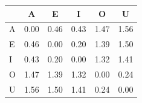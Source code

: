 \begin{tabular}{lccccc}
\toprule
\rowcolor{col01}
 & A & E & I & O & U \\
\midrule
A & 0.00 & 0.46 & 0.43 & 1.47 & 1.56 \\
E & 0.46 & 0.00 & 0.20 & 1.39 & 1.50 \\
I & 0.43 & 0.20 & 0.00 & 1.32 & 1.41 \\
O & 1.47 & 1.39 & 1.32 & 0.00 & 0.24 \\
U & 1.56 & 1.50 & 1.41 & 0.24 & 0.00 \\
\bottomrule
\end{tabular}
